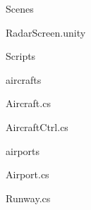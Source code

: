 \begin{minipage}[t]{0.6\textwidth}
\begin{footnotesize}
\begin{description}
	\item \faFolderOpen\ Scenes
	\begin{description}
		\item \faVideoCamera\ RadarScreen.unity
	\end{description}
	
	\item \faFolderOpen\ Scripts
	\begin{description}
		\item \faFolderOpenO\ aircrafts
		\begin{description}
			\item \faFileCodeO\ Aircraft.cs
			\item \faFileCodeO\ AircraftCtrl.cs			
		\end{description}
		
		\item \faFolderOpenO\ airports
			\begin{description}
				\item \faFileCodeO\ Airport.cs
				\item \faFileCodeO\ Runway.cs			
			\end{description}
	\end{description}
	
\end{description}
\end{footnotesize}	
\end{minipage}
%
